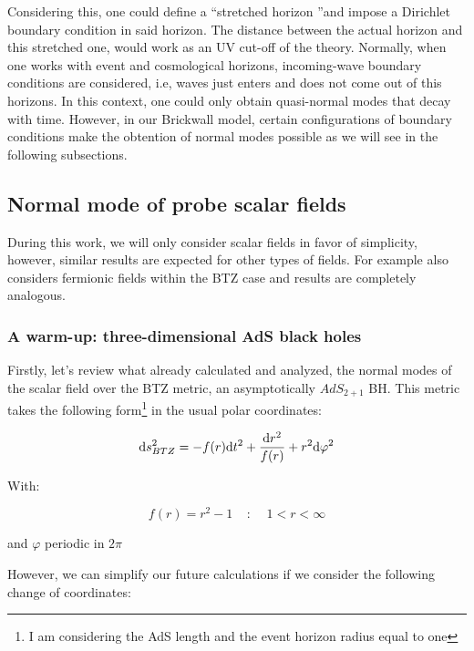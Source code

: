 \documentclass[11pt,a4paper]{article}
\begin{document}
Considering this, one could define a \textquotedblleft stretched horizon \textquotedblright and impose a Dirichlet boundary condition in said horizon. The distance between the actual horizon and this stretched one, would work as an UV cut-off of the theory. Normally, when one works with event and cosmological horizons, incoming-wave boundary conditions are considered, i.e, waves just enters and does not come out of this horizons. In this context, one could only obtain quasi-normal modes that decay with time. However, in our Brickwall model, certain configurations of boundary conditions make the obtention of normal modes possible as we will see in the following subsections.

\subsection{Normal mode of probe scalar fields}

During this work, we will only consider scalar fields in favor of simplicity, however, similar results are expected for other types of fields. For example \cite{Jeong_2025} also considers fermionic fields within the BTZ case and results are completely analogous.

\subsubsection{A warm-up: three-dimensional AdS black holes}

Firstly, let's review what \cite{Jeong_2025,Das_2023,das2023fuzzballsrandommatrices} already calculated and analyzed, the normal modes of the scalar field over the BTZ metric, an asymptotically $AdS_{2+1}$ BH. This metric takes the following form\footnote{I am considering the AdS length and the event horizon radius equal to one} in the usual polar coordinates:

\begin{equation}\LA{BTZ_METRIC}
    \dd s^2_{BTZ} = -f(r)\dd t^2 + \frac{\dd r^2}{f(r)} + r^2 \dd\varphi^2
\end{equation}

{\noindent With:}

\begin{equation}
    f(r) = r^2 - 1 ~~~~~:~~~~~ 1 < r < \infty
\end{equation}

{\noindent and $\varphi$ periodic in $2\pi$}

However, we can simplify our future calculations if we consider the following change of coordinates:
\end{document}
